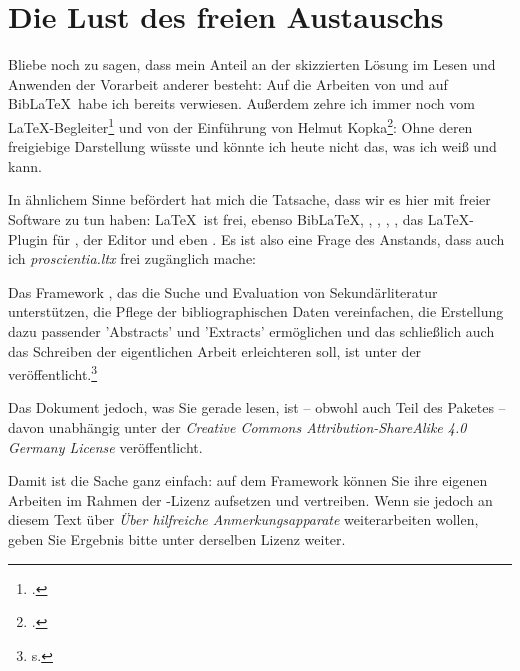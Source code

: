 
\section{Die Lust des freien Austauschs}

Bliebe noch zu sagen, dass mein Anteil an der skizzierten Lösung im Lesen und Anwenden der Vorarbeit anderer besteht: Auf die Arbeiten von  und auf Bib\LaTeX\ habe ich bereits verwiesen. Außerdem zehre ich immer noch vom \LaTeX-Begleiter\footcite[vgl.][S. 741ff]{MitGoo2005a} und von der Einführung von Helmut Kopka\footcite[vgl.][]{Kopka2000a}: Ohne deren freigiebige Darstellung wüsste und könnte ich heute nicht das, was ich weiß und kann.

In ähnlichem Sinne befördert hat mich die Tatsache, dass wir es hier mit freier Software zu tun haben: \LaTeX\ ist frei, ebenso Bib\LaTeX, ,  , , , das \LaTeX-Plugin für , der Editor   und eben . Es ist also eine Frage des Anstands, dass auch ich \textit{proscientia.ltx} frei zugänglich mache:

Das Framework , das die Suche und Evaluation von Sekundärliteratur unterstützen, die Pflege der bibliographischen Daten vereinfachen, die Erstellung dazu passender ’Abstracts’ und ’Extracts’ ermöglichen und das schließlich auch das Schreiben der eigentlichen Arbeit erleichteren soll, ist unter der  veröffentlicht.\footnote{s. }

Das Dokument jedoch, was Sie gerade lesen, ist -- obwohl auch Teil des Paketes -- davon unabhängig unter der \textit{Creative Commons Attribution-ShareAlike 4.0 Germany License} veröffentlicht.

Damit ist die Sache ganz einfach: auf dem Framework  können Sie ihre eigenen Arbeiten im Rahmen der -Lizenz aufsetzen und vertreiben. Wenn sie jedoch an diesem Text über \textit{Über hilfreiche Anmerkungsapparate} weiterarbeiten wollen, geben Sie Ergebnis bitte unter derselben Lizenz weiter.
